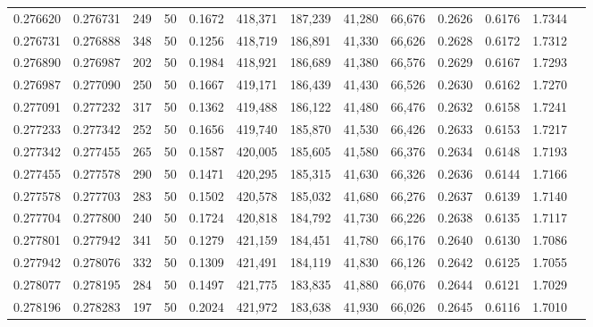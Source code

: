 \begin{tabular}{rrrrrrrrrrrrr}
0.276620 & 0.276731 &   249 &  50 &                                     0.1672 & 418,371 & 187,239 &  41,280 &  66,676 & 0.2626 & 0.6176 & 1.7344 \\
0.276731 & 0.276888 &   348 &  50 &                                     0.1256 & 418,719 & 186,891 &  41,330 &  66,626 & 0.2628 & 0.6172 & 1.7312 \\
0.276890 & 0.276987 &   202 &  50 &                                     0.1984 & 418,921 & 186,689 &  41,380 &  66,576 & 0.2629 & 0.6167 & 1.7293 \\
0.276987 & 0.277090 &   250 &  50 &                                     0.1667 & 419,171 & 186,439 &  41,430 &  66,526 & 0.2630 & 0.6162 & 1.7270 \\
0.277091 & 0.277232 &   317 &  50 &                                     0.1362 & 419,488 & 186,122 &  41,480 &  66,476 & 0.2632 & 0.6158 & 1.7241 \\
0.277233 & 0.277342 &   252 &  50 &                                     0.1656 & 419,740 & 185,870 &  41,530 &  66,426 & 0.2633 & 0.6153 & 1.7217 \\
0.277342 & 0.277455 &   265 &  50 &                                     0.1587 & 420,005 & 185,605 &  41,580 &  66,376 & 0.2634 & 0.6148 & 1.7193 \\
0.277455 & 0.277578 &   290 &  50 &                                     0.1471 & 420,295 & 185,315 &  41,630 &  66,326 & 0.2636 & 0.6144 & 1.7166 \\
0.277578 & 0.277703 &   283 &  50 &                                     0.1502 & 420,578 & 185,032 &  41,680 &  66,276 & 0.2637 & 0.6139 & 1.7140 \\
0.277704 & 0.277800 &   240 &  50 &                                     0.1724 & 420,818 & 184,792 &  41,730 &  66,226 & 0.2638 & 0.6135 & 1.7117 \\
0.277801 & 0.277942 &   341 &  50 &                                     0.1279 & 421,159 & 184,451 &  41,780 &  66,176 & 0.2640 & 0.6130 & 1.7086 \\
0.277942 & 0.278076 &   332 &  50 &                                     0.1309 & 421,491 & 184,119 &  41,830 &  66,126 & 0.2642 & 0.6125 & 1.7055 \\
0.278077 & 0.278195 &   284 &  50 &                                     0.1497 & 421,775 & 183,835 &  41,880 &  66,076 & 0.2644 & 0.6121 & 1.7029 \\
0.278196 & 0.278283 &   197 &  50 &                                     0.2024 & 421,972 & 183,638 &  41,930 &  66,026 & 0.2645 & 0.6116 & 1.7010 \\

\end{tabular}
